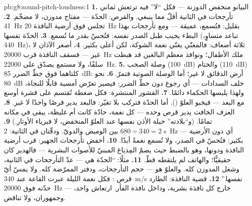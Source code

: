 \begin{solution}{pb:g8:sound-pitch-loudness:1}
\textbf{1.} البيانو منخفض الدوزنة --- فكل ``لا'' فيه ترتعش
ثماني تأرجحات في الثانية أقلّ مما ينبغي. والقرص: الحدّة ---
مفتاح مدوزن، لا مضخّم.
\textbf{2.} \qty{41}{Hz} تجلس فوق أرضية النافذة \qty{20}{Hz}
بقليل: فتُسمع، عميقة --- ومع تأرجحات بهذا البطء يجيب طبل
الصدر نفسه: فتُحسّ بقدر ما تُسمع.
\textbf{3.} الحدّة نفسها (تباعد متساوٍ، \qty{440}{Hz})، 
ثلاثة أضعاف: فالمغنّي يغنّي نغمة الشوكة، لكن أعلى بكثير.
\textbf{4.} أصغر الآذان لا غير --- فسقف النافذة قرب
\qty{20000}{Hz} ملك الأطفال؛ ونوافذ معظم البالغين قد هبطت
سلفًا، ولا مستمع يصدّق على \qty{22000}{Hz}.
\textbf{5.} وصلة الصخب (\qty{100}{dB}) والختام
(\qty{110}{dB}) كلتاهما فوق خطّ الضرر \qty{85}{dB}: أرض
الدقائق لا غير؛ أما الوصلة الصوتية فتمرّ.
\textbf{6.} نحو \qty{80}{dB} خلف السدادات --- أي رجوع دون خطّ
الضرر: فيصير تعرّض أمسية قابلًا للنجاة، ولهذا يلبسها الحكماء
دائمًا.
\textbf{7.} القشور المنتشرة: فكل ضغطة تُقتسم على قشرة أوسع مع
البعد --- فيخبو العلوّ (). أما الحدّة فتركب بلا تغيّر:
فالبعد يدير قرصًا واحدًا لا غير.
\textbf{8.} العزف الخافت يدير قرص  وحده ---  كل
نغمة، حادّة كانت أم غليظة، يبقى في مكانه تمامًا. (و``بلادته''
حيلة الأذن نفسها عند العلوّ المنخفض، لا فيزياء الأوتار.)
\textbf{9.} $680 \div 340 = \qty{2}{s}$ بين الوميض والدويّ.
ودقّتان في الثانية: \qty{2}{Hz} --- أي دون الأرضية بكثير:
فتُحسّ في الصدر، ولا تُسمع نغمةً أبدًا.
\textbf{10.} أخفض تأرجحات الجهير: قرب أرضية النافذة ودونها،
وهو بالضبط حيث يصمّ المِذياع المبنيّ للأصوات البشرية ---
فالهدير كان حقيقيًّا؛ والهاتف لم يلتقطه قطّ.
\textbf{11.} مثلًا: ``الحدّة هي  --- عدّ التأرجحات في
الثانية، وشغل المدوزن كله. والعلوّ هو  --- حجم
التأرجحات، ودفتر الممرّضة كله. ولا يمسّ أيّ قرص : فكل
نغمة الليلة عبرت القاعة عند \qty{340}{m/s} نفسها.''
\textbf{12.} قضية النافذة: الطارد حدّته فوق \qty{20000}{Hz}
--- خارج كل نافذة بشرية، وداخل نافذة الفأر. ارتعاش واحد،
وجمهوران، ولا تناقض.
\end{solution}
